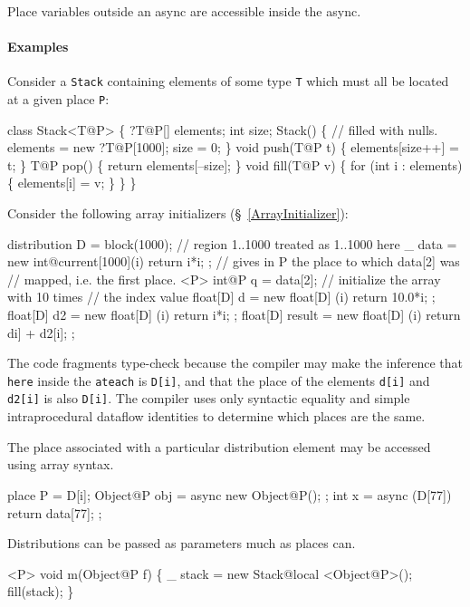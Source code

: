 Place variables outside an async are accessible inside the async.

\paragraph{Examples}
Consider a {\tt Stack} containing elements of some type {\tt T} which must
all be located at a given place {\tt P}:
\begin{x10}
 class Stack<T@P> \{
     ?T@P[] elements;
     int size;
     Stack() \{
         // filled with nulls.
         elements = new ?T@P[1000]; 
         size = 0;
     \}
     void push(T@P t) \{ elements[size++] = t; \}
     T@P pop() \{ return elements[--size]; \}
     void fill(T@P v) \{ 
         for (int i : elements) \{ 
            elements[i] = v; 
         \} 
     \}
 \}
\end{x10}

Consider the following array initializers (\S~\ref{ArrayInitializer}):
\begin{x10}
  distribution D = block(1000);
  // region 1..1000 treated as 1..1000 here
  \_ data = new int@current[1000](i){ return i*i; }; 
    // gives in P the place to which data[2] was 
    // mapped, i.e. the first place.
  <P> int@P q = data[2]; 
    // initialize the array with 10 times 
    // the index value
  float[D] d = new float[D] (i){ return 10.0*i; };
  float[D] d2 = new float[D] (i){ return i*i; };
  float[D] result = 
    new float[D] (i){ return di] + d2[i]; };
\end{x10}

The code fragments type-check because the compiler may make the
inference that {\tt here} inside the {\tt ateach} is {\tt D[i]}, and
that the place of the elements {\tt d[i]} and {\tt d2[i]} is also 
{\tt D[i]}. The \Xten{} compiler uses only syntactic equality and simple
intraprocedural dataflow identities to determine which places are the
same.  

The place associated with a particular distribution element may be
accessed using array syntax.
\begin{x10}
  place P = D[i];
  Object@P obj = async { new Object@P(); };
  int x = async (D[77]) { return data[77]; };
\end{x10}
Distributions can be passed as parameters much as places can.

\begin{x10}
 <P> void m(Object@P f) \{
    \_ stack = new Stack@local <Object@P>();
    fill(stack);
 \}
\end{x10}

